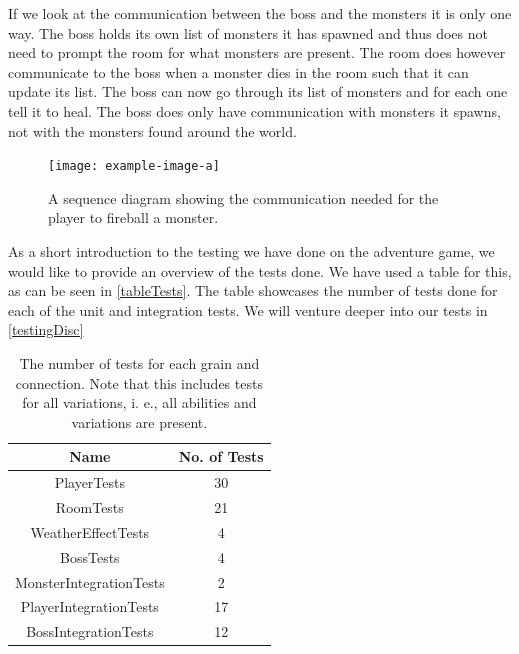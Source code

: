 If we look at the communication between the boss and the monsters it is only one way. The boss holds its own list of monsters it has spawned and thus does not need to prompt the room for what monsters are present. The room does however communicate to the boss when a monster dies in the room such that it can update its list. The boss can now go through its list of monsters and for each one tell it to heal. The boss does only have communication with monsters it spawns, not with the monsters found around the world.\\

\begin{figure}[H]
	\centering
	\texttt{[image: example-image-a]}
	\caption{A sequence diagram showing the communication needed for the player to fireball a monster.}
	\label{PLayerFireballFlow}
\end{figure}

As a short introduction to the testing we have done on the adventure game, we would like to provide an overview of the tests done. We have used a table for this, as can be seen in \autoref{tableTests}. The table showcases the number of tests done for each of the unit and integration tests. We will venture deeper into our tests in \autoref{testingDisc}
\begin{table}[H]
	\centering
	\begin{tabular}{| c | c |} \hline
		\textbf{Name} & \textbf{No. of Tests} \\ \hline
		PlayerTests & 30 \\ \hline
		RoomTests & 21 \\ \hline
		WeatherEffectTests & 4 \\ \hline
		BossTests & 4 \\ \hline
		MonsterIntegrationTests & 2 \\ \hline
		PlayerIntegrationTests & 17 \\ \hline
		BossIntegrationTests & 12 \\ \hline
	\end{tabular}
	\caption{The number of tests for each grain and connection. Note that this includes tests for all variations, i. e., all abilities and variations are present.}
	\label{tableTests}
\end{table}

